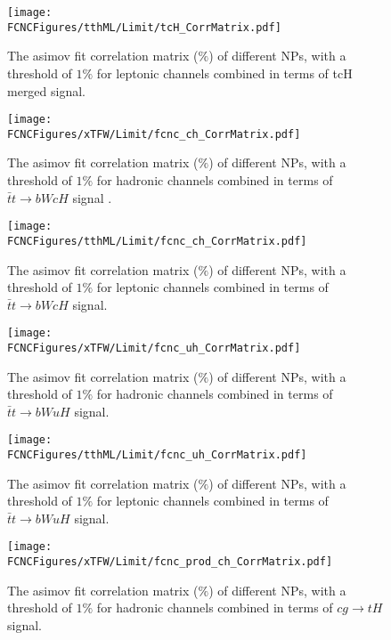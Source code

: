 \begin{figure}[H]
\centering
\texttt{[image: \\FCNCFigures/tthML/Limit/tcH\_CorrMatrix.pdf]}
\caption{ The asimov fit correlation matrix ($\%$) of different NPs, with a threshold of $1\%$ for leptonic channels combined in terms of tcH merged signal.}
\label{fig:tcH_CorrMatrix_2}
\end{figure}


\begin{figure}[H]
\centering
\texttt{[image: \\FCNCFigures/xTFW/Limit/fcnc\_ch\_CorrMatrix.pdf]}
\caption{ The asimov fit correlation matrix ($\%$) of different NPs, with a threshold of $1\%$ for hadronic channels combined in terms of $\bar{t}t\to bWcH$ signal . }
\label{fig:fcnc_ch_CorrMatrix_1}
\end{figure}

\begin{figure}[H]
\centering
\texttt{[image: \\FCNCFigures/tthML/Limit/fcnc\_ch\_CorrMatrix.pdf]}
\caption{ The asimov fit correlation matrix ($\%$) of different NPs, with a threshold of $1\%$ for  leptonic channels combined in terms of $\bar{t}t\to bWcH$ signal. }
\label{fig:fcnc_ch_CorrMatrix_2}
\end{figure}


\begin{figure}[H]
\centering
\texttt{[image: \\FCNCFigures/xTFW/Limit/fcnc\_uh\_CorrMatrix.pdf]}
\caption{ The asimov fit correlation matrix ($\%$) of different NPs, with a threshold of $1\%$ for hadronic channels combined in terms of $\bar{t}t\to bWuH$ signal.}
\label{fig:fcnc_uh_CorrMatrix_1}
\end{figure}



\begin{figure}[H]
\centering
\texttt{[image: \\FCNCFigures/tthML/Limit/fcnc\_uh\_CorrMatrix.pdf]}
\caption{ The asimov fit correlation matrix ($\%$) of different NPs, with a threshold of $1\%$ for  leptonic channels combined in terms of $\bar{t}t\to bWuH$ signal.}
\label{fig:fcnc_uh_CorrMatrix_2}
\end{figure}



\begin{figure}[H]
\centering
\texttt{[image: \\FCNCFigures/xTFW/Limit/fcnc\_prod\_ch\_CorrMatrix.pdf]}
\caption{ The asimov fit correlation matrix ($\%$) of different NPs, with a threshold of $1\%$ for hadronic channels combined in terms of $cg\to tH$ signal.}
\label{fig:fcnc_prod_ch_CorrMatrix_1}
\end{figure}



